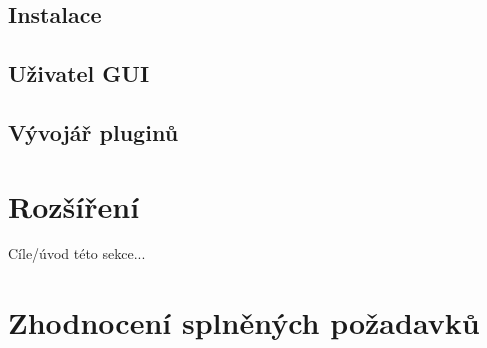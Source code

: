 \subsection{Instalace}

\subsection{Uživatel GUI}

\subsection{Vývojář pluginů}

\section{Rozšíření}
Cíle/úvod této sekce...

\section{Zhodnocení splněných požadavků}